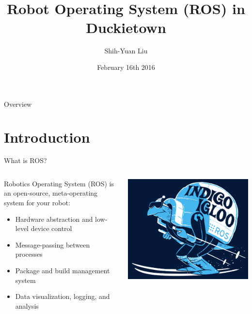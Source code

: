 \documentclass{beamer}
\author[Shih-Yuan Liu]{Shih-Yuan Liu}
\title[ROS in Duckietown]{Robot Operating System (ROS) in Duckietown}
\institute[Duckietown MIT]{Duckietown, MIT}
\date[Feb. 16th, 2016]{February 16th 2016}
\begin{document}

\begin{frame}[plain,label=titlepage,noframenumbering] %
	\titlepage
\end{frame}

\begin{frame}[label=overview]{Overview}
	\tableofcontents
\end{frame}


\section{Introduction}

\begin{frame}{What is ROS?}
\begin{columns}
	\begin{column}{0.55\textwidth}
		Robotics Operating System (ROS) is an \alert{open-source}, \alert{meta-operating system} for your \alert{robot}:
		\begin{itemize}
			\item Hardware abstraction and low-level device control
			\item Message-passing between processes
			\item Package and build management system
			\item Data visualization, logging, and analysis
		\end{itemize}
	\end{column}
	\begin{column}{0.45\textwidth}
		\centering
		\includegraphics[width=\textwidth]{fig/indigoigloo_600.png}
	\end{column}
\end{columns}
\end{frame}
\end{document}
